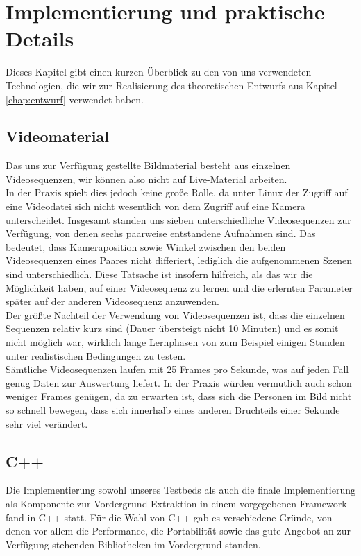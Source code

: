 \section{Implementierung und praktische Details}
\label{chap:implementierung}

Dieses Kapitel gibt einen kurzen Überblick zu den von uns verwendeten Technologien, die wir zur Realisierung des theoretischen Entwurfs aus Kapitel \ref{chap:entwurf} verwendet haben.


\subsection{Videomaterial}
\label{sec:videomat}

Das uns zur Verfügung gestellte Bildmaterial besteht aus einzelnen Videosequenzen, wir können also nicht auf Live-Material arbeiten.\\

In der Praxis spielt dies jedoch keine große Rolle, da unter Linux der Zugriff auf eine Videodatei sich nicht wesentlich von dem Zugriff auf eine Kamera unterscheidet.
Insgesamt standen uns sieben unterschiedliche Videosequenzen zur Verfügung, von denen sechs paarweise entstandene Aufnahmen sind.
 Das bedeutet, dass Kameraposition sowie Winkel zwischen den beiden Videosequenzen eines Paares nicht differiert, lediglich die aufgenommenen Szenen sind unterschiedlich.
 Diese Tatsache ist insofern hilfreich, als das wir die Möglichkeit haben, auf einer Videosequenz zu lernen und die erlernten Parameter später auf der anderen Videosequenz anzuwenden.\\
Der größte Nachteil der Verwendung von Videosequenzen ist, dass die einzelnen Sequenzen relativ kurz sind (Dauer übersteigt nicht 10 Minuten) und es somit nicht möglich war, wirklich lange Lernphasen von zum Beispiel einigen Stunden unter realistischen Bedingungen zu testen.\\
Sämtliche Videosequenzen laufen mit 25 Frames pro Sekunde, was auf jeden Fall genug Daten zur Auswertung liefert.
 In der Praxis würden vermutlich auch schon weniger Frames genügen, da zu erwarten ist, dass sich die Personen im Bild nicht so schnell bewegen, dass sich innerhalb eines anderen Bruchteils einer Sekunde sehr viel verändert.

\subsection{C++}
\label{sec:cpp}
Die Implementierung sowohl unseres Testbeds als auch die finale Implementierung als Komponente zur Vordergrund-Extraktion in einem vorgegebenen Framework fand in C++ statt.
 Für die Wahl von C++ gab es verschiedene Gründe, von denen vor allem die Performance, die Portabilität sowie das gute Angebot an zur Verfügung stehenden Bibliotheken im Vordergrund standen.

